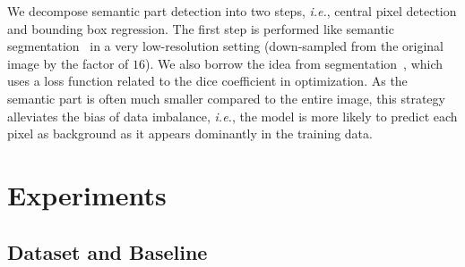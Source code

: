 \documentclass[10pt,twocolumn,letterpaper]{article}
\begin{document}
  We decompose semantic part detection into two steps, {\em i.e.}, central pixel detection and bounding box regression. The first step is performed like semantic segmentation~\cite{Long_2015_Fully} in a very low-resolution setting (down-sampled from the original image by the factor of $16$). We also borrow the idea from segmentation~\cite{Milletari_2016_V}, which uses a loss function related to the dice coefficient in optimization. As the semantic part is often much smaller compared to the entire image, this strategy alleviates the bias of data imbalance, {\em i.e.}, the model is more likely to predict each pixel as background as it appears dominantly in the training data.


  \section{Experiments}
  \label{Experiments}

  \subsection{Dataset and Baseline}
  \label{Experiments:Settings}
\end{document}

